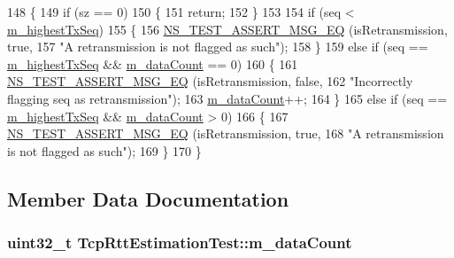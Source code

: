 \begin{DoxyCode}
148 \{
149   \textcolor{keywordflow}{if} (sz == 0)
150     \{
151       \textcolor{keywordflow}{return};
152     \}
153 
154   \textcolor{keywordflow}{if} (seq < \hyperlink{classTcpRttEstimationTest_a3c08a5a07c9dc4c9c85c6d8fe4f7ca68}{m\_highestTxSeq})
155     \{
156       \hyperlink{group__testing_ga2a9d78cffb3db8e867c35fff0b698cf5}{NS\_TEST\_ASSERT\_MSG\_EQ} (isRetransmission, \textcolor{keyword}{true},
157                              \textcolor{stringliteral}{"A retransmission is not flagged as such"});
158     \}
159   \textcolor{keywordflow}{else} \textcolor{keywordflow}{if} (seq == \hyperlink{classTcpRttEstimationTest_a3c08a5a07c9dc4c9c85c6d8fe4f7ca68}{m\_highestTxSeq} && \hyperlink{classTcpRttEstimationTest_afc3c949430c9dddc0c6d761d3d8ebf30}{m\_dataCount} == 0)
160     \{
161       \hyperlink{group__testing_ga2a9d78cffb3db8e867c35fff0b698cf5}{NS\_TEST\_ASSERT\_MSG\_EQ} (isRetransmission, \textcolor{keyword}{false},
162                              \textcolor{stringliteral}{"Incorrectly flagging seq as retransmission"});
163       \hyperlink{classTcpRttEstimationTest_afc3c949430c9dddc0c6d761d3d8ebf30}{m\_dataCount}++;
164     \}
165   \textcolor{keywordflow}{else} \textcolor{keywordflow}{if} (seq == \hyperlink{classTcpRttEstimationTest_a3c08a5a07c9dc4c9c85c6d8fe4f7ca68}{m\_highestTxSeq} && \hyperlink{classTcpRttEstimationTest_afc3c949430c9dddc0c6d761d3d8ebf30}{m\_dataCount} > 0)
166     \{
167       \hyperlink{group__testing_ga2a9d78cffb3db8e867c35fff0b698cf5}{NS\_TEST\_ASSERT\_MSG\_EQ} (isRetransmission, \textcolor{keyword}{true},
168                              \textcolor{stringliteral}{"A retransmission is not flagged as such"});
169     \}
170 \}
\end{DoxyCode}


\subsection{Member Data Documentation}
\subsubsection[{\texorpdfstring{m\+\_\+data\+Count}{m_dataCount}}]{\setlength{\rightskip}{0pt plus 5cm}uint32\+\_\+t Tcp\+Rtt\+Estimation\+Test\+::m\+\_\+data\+Count\hspace{0.3cm}{\ttfamily [private]}}\hypertarget{classTcpRttEstimationTest_afc3c949430c9dddc0c6d761d3d8ebf30}{}\label{classTcpRttEstimationTest_afc3c949430c9dddc0c6d761d3d8ebf30}


